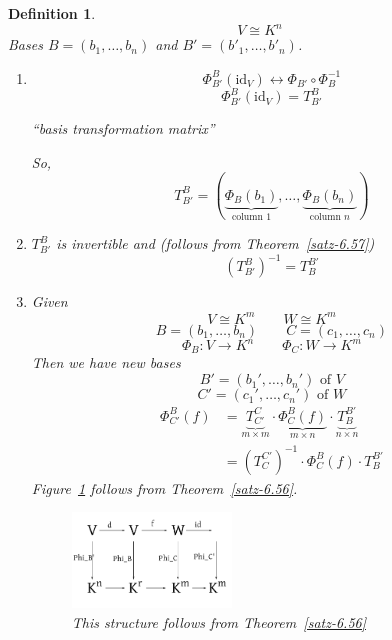 \documentclass[a4paper,landscape,twocolumn]{article}
\newtheorem{defi}{Definition}
\begin{document}
\begin{defi}
  \label{satz-6.58}
  \[ V \cong K^n \]
  Bases $B = (b_1, \ldots, b_n)$ and $B' = (b'_1, \ldots, b'_n)$.
  \begin{enumerate}
    \item
      \[ \Phi_{B'}^B(\text{id}_V) \leftrightarrow \Phi_{B'} \circ \Phi_B^{-1} \]
      \[ \Phi_{B'}^B(\text{id}_V) = T_{B'}^B \]
      \begin{center}
        \enquote{basis transformation matrix}
      \end{center}
      So,
      \[ T_{B'}^B = (\underbrace{\Phi_B(b_1)}_{\text{column $1$}}, \ldots, \underbrace{\Phi_B(b_n)}_{\text{column $n$}}) \]
    \item $T_{B'}^B$ is invertible and (follows from Theorem~\ref{satz-6.57})
      \[ \left(T_{B'}^B\right)^{-1} = T_B^{B'} \]
    \item
      Given
      \[ V \cong K^m \qquad W \cong K^m \]
      \[ B = (b_1, \ldots, b_n)  \qquad  C = (c_1, \ldots, c_n)  \]
      \[ \Phi_B:  V \to K^n \qquad \Phi_C: W \to K^m \]
      Then we have new bases
      \[ B' = (b_1', \ldots, b_n') \text{ of } V \]
      \[ C' = (c_1', \ldots, c_n') \text{ of } W \]
      \begin{align*}
        \Phi_{C'}^B(f) &=
          \underbrace{T_{C'}^C}_{m \times m} \cdot
          \underbrace{\Phi_C^B(f)}_{m\times n} \cdot
          \underbrace{T_B^{B'}}_{n\times n} \\
        &= \left(T_C^{C'}\right)^{-1} \cdot \Phi_C^B(f) \cdot T_B^{B'}
      \end{align*}
      Figure~\ref{img:other-2-lin-maps} follows from Theorem~\ref{satz-6.56}.
      \begin{figure}[!h]
        \begin{center}
          \includegraphics[width=0.4\textwidth]{img/other_two_linear_mappings.pdf}
          \caption{This structure follows from Theorem~\ref{satz-6.56}}
          \label{img:other-2-lin-maps}
        \end{center}
      \end{figure}
  \end{enumerate}
\end{defi}
\end{document}

